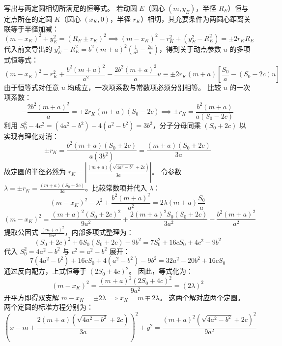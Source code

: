 \begin{solution}
写出与两定圆相切所满足的恒等式。
若动圆 $E$（圆心 $(m, y_E)$，半径 $R_E$）恒与定点所在的定圆 $K$（圆心 $(x_K, 0)$，半径 $r_K$）相切，其充要条件为两圆心距离关联等于半径加减：
$$ (m - x_K)^2 + y_E^2 = (R_E \pm r_K)^2 \implies (m - x_K)^2 - r_K^2 + (y_E^2 - R_E^2) = \pm 2r_K R_E $$
代入前文导出的 $y_E^2 - R_E^2 = b^2(m+a)^2\left(\frac{1}{a^2} - \frac{2u}{a}\right)$，得到关于动点参数 $u$ 的多项式恒等式：
$$ (m - x_K)^2 - r_K^2 + \frac{b^2(m+a)^2}{a^2} - \frac{2b^2(m+a)^2}{a} u \equiv \pm 2r_K (m+a) \left[ \frac{S_0}{a} - (S_0 - 2c)u \right] $$
由于恒等式对任意 $u$ 均成立，一次项系数与常数项必须分别相等。
比较 $u$ 的一次项系数：
$$ -\frac{2b^2(m+a)^2}{a} = \mp 2r_K (m+a)(S_0 - 2c) \implies \pm r_K = \frac{b^2(m+a)}{a(S_0 - 2c)} $$
利用 $S_0^2 - 4c^2 = (4a^2-b^2) - 4(a^2-b^2) = 3b^2$，分子分母同乘 $(S_0 + 2c)$ 以实现有理化对消：
$$ \pm r_K = \frac{b^2(m+a)(S_0 + 2c)}{a(3b^2)} = \frac{(m+a)(S_0 + 2c)}{3a} $$
故定圆的半径必然为 $r_K = \left| \frac{(m+a)(\sqrt{4a^2-b^2} + 2c)}{3a} \right|$。
令参数 $\lambda = \pm r_K = \frac{(m+a)(S_0 + 2c)}{3a}$。比较常数项并代入 $\lambda$：
$$ (m - x_K)^2 - \lambda^2 + \frac{b^2(m+a)^2}{a^2} = 2\lambda (m+a) \frac{S_0}{a} $$
$$ (m - x_K)^2 = \frac{(m+a)^2(S_0 + 2c)^2}{9a^2} + \frac{2(m+a)^2 S_0(S_0 + 2c)}{3a^2} - \frac{b^2(m+a)^2}{a^2} $$
提取公因式 $\frac{(m+a)^2}{9a^2}$，内部多项式整理为：
$$ (S_0 + 2c)^2 + 6S_0(S_0 + 2c) - 9b^2 = 7S_0^2 + 16c S_0 + 4c^2 - 9b^2 $$
代入 $S_0^2 = 4a^2-b^2$ 与 $c^2 = a^2-b^2$ 展开：
$$ 7(4a^2-b^2) + 16c S_0 + 4(a^2-b^2) - 9b^2 = 32a^2 - 20b^2 + 16c S_0 $$
通过反向配方，上式恒等于 $(2S_0 + 4c)^2$。
因此，等式化为：
$$ (m - x_K)^2 = \frac{(m+a)^2 (2S_0 + 4c)^2}{9a^2} = (2\lambda)^2 $$
开平方即得双支解 $m - x_K = \pm 2\lambda \implies x_K = m \mp 2\lambda$。
这两个解对应两个定圆。
两个定圆的标准方程分别为：
$$ \left(x - m \pm \frac{2(m+a)(\sqrt{4a^2-b^2}+2c)}{3a}\right)^2 + y^2 = \frac{(m+a)^2(\sqrt{4a^2-b^2}+2c)^2}{9a^2} $$
\end{solution}

